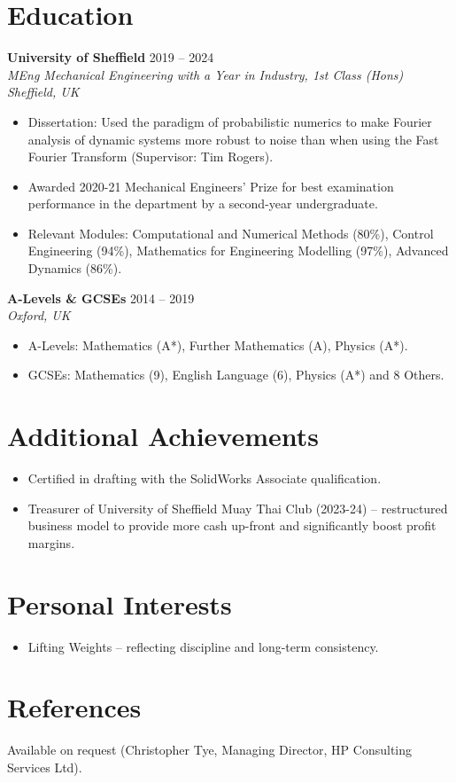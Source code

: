 \documentclass[a4paper,10pt]{article}
\newcommand{\resumeSubheading}[4]{
  \vspace{1pt}\textbf{#1} \hfill #2 \\
  \textit{#3} \hfill \textit{#4}
}
\newcommand{\resumeItem}[1]{\item{#1}}
\newcommand{\resumeItemListStart}{\begin{itemize}[leftmargin=*]}
\newcommand{\resumeItemListEnd}{\end{itemize}}
\begin{document}
\section{Education}

\resumeSubheading{University of Sheffield}{2019 -- 2024}{MEng Mechanical Engineering with a Year in Industry, 1st Class (Hons)}{Sheffield, UK}
\resumeItemListStart
  \resumeItem{Dissertation: Used the paradigm of probabilistic numerics to make Fourier analysis of dynamic systems more robust to noise than when using the Fast Fourier Transform (Supervisor: Tim Rogers).}
  \resumeItem{Awarded 2020-21 Mechanical Engineers' Prize for best examination performance in the department by a second-year undergraduate.}
  \resumeItem{Relevant Modules: Computational and Numerical Methods (80\%), Control Engineering (94\%), Mathematics for Engineering Modelling (97\%), Advanced Dynamics (86\%).}
\resumeItemListEnd

\resumeSubheading{A-Levels \& GCSEs}{2014 -- 2019}{}{Oxford, UK}

\vspace{-2em}

\resumeItemListStart
  \resumeItem{A-Levels: Mathematics (A*), Further Mathematics (A), Physics (A*).}
  \resumeItem{GCSEs: Mathematics (9), English Language (6), Physics (A*) and 8 Others.}
\resumeItemListEnd

\section{Additional Achievements}

\resumeItemListStart
  \resumeItem{Certified in drafting with the SolidWorks Associate qualification.}
  \resumeItem{Treasurer of University of Sheffield Muay Thai Club (2023-24) -- restructured business model to provide more cash up-front and significantly boost profit margins.}
\resumeItemListEnd

\section{Personal Interests}

\resumeItemListStart
  \resumeItem{Lifting Weights -- reflecting discipline and long-term consistency.}
\resumeItemListEnd

\section{References}
Available on request (Christopher Tye, Managing Director, HP Consulting Services Ltd).
\end{document}
